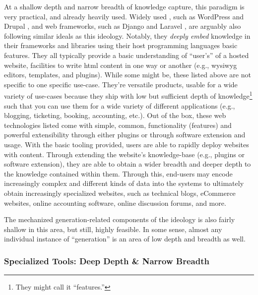 At a shallow depth and narrow breadth of knowledge capture, this paradigm is
very practical, and already heavily used. Widely used , such as
WordPress \cite{WordPress} and Drupal \cite{Drupal}, and web frameworks, such as
Django \cite{Django} and Laravel \cite{Laravel}, are arguably also following
similar ideals as this ideology. Notably, they \textit{deeply embed}
\cite{Carette2009} knowledge in their frameworks and libraries using their host
programming languages basic features. They all typically provide a basic
understanding of ``user's'' of a hosted website, facilities to write \acs{html}
content in one way or another (e.g., \acs{wysiwyg} editors, templates, and
plugins). While some might be, these listed above are not specific to one
specific use-case. They're versatile products, usable for a wide variety of
use-cases because they ship with low but sufficient depth of
knowledge\footnote{They might call it ``features.''} such that you can use them
for a wide variety of different applications (e.g., blogging, ticketing,
booking, accounting, etc.). Out of the box, these web technologies listed come
with simple, common, functionality (features) and powerful extensibility through
either plugins or through software extension and usage. With the basic tooling
provided, users are able to rapidly deploy websites with content. Through
extending the website's knowledge-base (e.g., plugins or software extension),
they are able to obtain a wider breadth and deeper depth to the knowledge
contained within them. Through this, end-users may encode increasingly complex
and different kinds of data into the systems to ultimately obtain increasingly
specialized websites, such as technical blogs, eCommerce websites, online
accounting software, online discussion forums, and more.

The mechanized generation-related components of the ideology is also fairly
shallow in this area, but still, highly feasible. In some sense, almost any
individual instance of ``generation'' is an area of low depth and breadth as
well.

\subsubsection{Specialized Tools: Deep Depth \& Narrow Breadth}
\label{chap:ideology:sec:thoughts_of_generation:subsec:feasibility:subsubsec:specialization}

